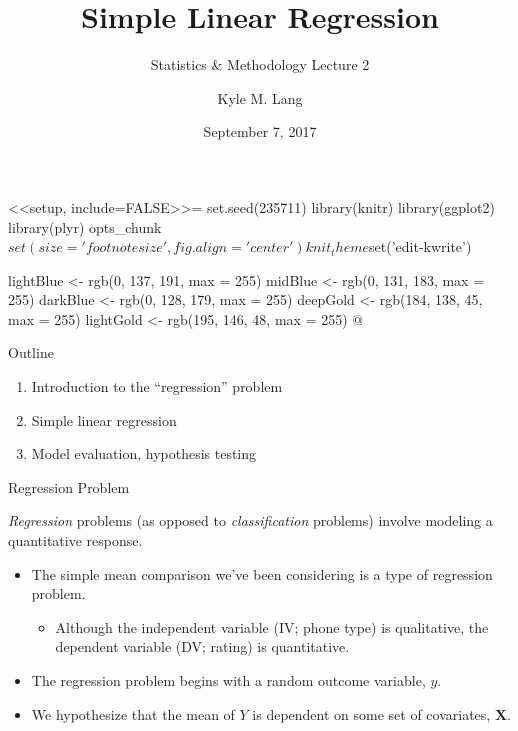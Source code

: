 \documentclass{beamer}
\title{Simple Linear Regression}
\subtitle{Statistics \& Methodology Lecture 2}
\author{Kyle M. Lang}
\institute{Department of Methodology \& Statistics\\Tilburg University}
\date{September 7, 2017}
\begin{document}


<<setup, include=FALSE>>=
set.seed(235711)
library(knitr)
library(ggplot2)
library(plyr)
opts_chunk$set(size = 'footnotesize', fig.align = 'center')
knit_theme$set('edit-kwrite')

lightBlue <- rgb(0, 137, 191, max = 255)
midBlue   <- rgb(0, 131, 183, max = 255)
darkBlue  <- rgb(0, 128, 179, max = 255)
deepGold  <- rgb(184, 138, 45, max = 255)
lightGold <- rgb(195, 146, 48, max = 255)
@


\begin{frame}[t,plain]
\titlepage
\end{frame}


\begin{frame}{Outline}

  \begin{enumerate}
  \item Introduction to the ``regression'' problem
    \va
  \item Simple linear regression
    \va
  \item Model evaluation, hypothesis testing
  \end{enumerate}

\end{frame}


\begin{frame}{Regression Problem}

  \emph{Regression} problems (as opposed to \emph{classification} problems)
  involve modeling a quantitative response.
  \va
  \begin{itemize}
  \item The simple mean comparison we've been considering is a type of
    regression problem.
    \vb
    \begin{itemize}
    \item Although the independent variable (IV; phone type) is qualitative, the
      dependent variable (DV; rating) is quantitative.
    \end{itemize}
    \va
  \item The regression problem begins with a random outcome variable, $y$.
    \va
  \item We hypothesize that the mean of $Y$ is dependent on some set of
    covariates, $\mathbf{X}$.
  \end{itemize}

\end{frame}

\watermarkoff
\end{document}
